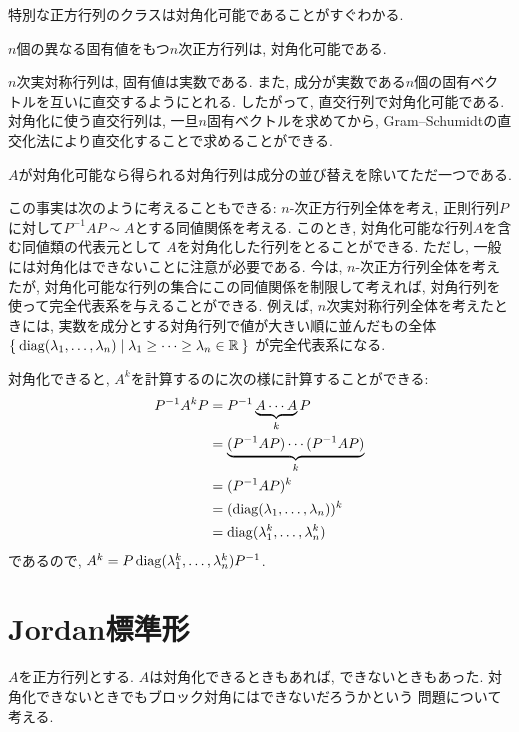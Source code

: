 特別な正方行列のクラスは対角化可能であることがすぐわかる.
\begin{example}
  $n$個の異なる固有値をもつ$n$次正方行列は, 対角化可能である.
\end{example}
\begin{example}
  $n$次実対称行列は, 固有値は実数である.
  また,
  成分が実数である$n$個の固有ベクトルを互いに直交するようにとれる.
  したがって,
  直交行列で対角化可能である.
  対角化に使う直交行列は, 一旦$n$固有ベクトルを求めてから,
  Gram--Schumidtの直交化法により直交化することで求めることができる.
\end{example}

\begin{remark}
  $A$が対角化可能なら得られる対角行列は成分の並び替えを除いてただ一つである.

  この事実は次のように考えることもできる:
  $n$-次正方行列全体を考え,
  正則行列$P$に対して$P^{-1}AP\sim A$とする同値関係を考える.
  このとき,
  対角化可能な行列$A$を含む同値類の代表元として
  $A$を対角化した行列をとることができる.
  ただし, 一般には対角化はできないことに注意が必要である.
  今は, $n$-次正方行列全体を考えたが,
  対角化可能な行列の集合にこの同値関係を制限して考えれば,
  対角行列を使って完全代表系を与えることができる.
  例えば, $n$次実対称行列全体を考えたときには,
  実数を成分とする対角行列で値が大きい順に並んだもの全体$\Set{\operatorname{diag}(\lambda_1,\ldots,\lambda_n)|\lambda_1\geq\cdots\geq\lambda_n\in \mathbb{R}}$
  が完全代表系になる.
\end{remark}

\begin{remark}
  対角化できると, $A^k$を計算するのに次の様に計算することができる:
  \begin{align*}
    P^{-1}A^kP&=P^{-1}\underbrace{A\cdots A}_{k}P\\
    &=\underbrace{(P^{-1}AP)\cdots (P^{-1}AP)}_{k}\\
    &=(P^{-1}AP)^k\\
    &=(\operatorname{diag}(\lambda_1,\ldots,\lambda_n))^k\\
    &=\operatorname{diag}(\lambda_1^k,\ldots,\lambda_n^k)
  \end{align*}
  であるので, $A^k=P\operatorname{diag}(\lambda_1^k,\ldots,\lambda_n^k)P^{-1}$.
\end{remark}

\section{Jordan標準形}
$A$を正方行列とする.
$A$は対角化できるときもあれば,
できないときもあった.
対角化できないときでもブロック対角にはできないだろうかという
問題について考える.

